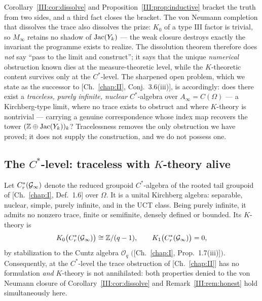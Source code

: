 \begin{remark}\label{III:rem:honest}
Corollary~\ref{III:cor:dissolve} and Proposition~\ref{III:prop:inductive} bracket the truth
from two sides, and a third fact closes the bracket. The von Neumann completion that
dissolves the trace also dissolves the prize: $K_0$ of a type III factor is trivial,
so $M_\infty$ retains no shadow of $\operatorname{Jac}(Y_k)$ --- the weak closure destroys exactly
the invariant the programme exists to realize. The dissolution theorem therefore does
\emph{not} say ``pass to the limit and construct''; it says that the unique
\emph{numerical} obstruction known dies at the measure-theoretic level, while the
$K$-theoretic content survives only at the $C^*$-level. The sharpened open problem,
which we state as the successor to [Ch.~\ref{chap:II}, Conj.~3.6(iii)], is accordingly: does there
exist a \emph{traceless, purely infinite, nuclear} $C^*$-algebra over
$A_\infty=C(\Omega)$ --- a Kirchberg-type limit, where no trace exists to obstruct and
where $K$-theory is nontrivial --- carrying a genuine correspondence whose index map
recovers the tower $(\mathbb{Z}\oplus\operatorname{Jac}(Y_k))_k$? Tracelessness removes the only obstruction
we have proved; it does not supply the construction, and we do not possess one.
\end{remark}

\subsection{The \texorpdfstring{$C^*$}{C*}-level: traceless with
\texorpdfstring{$K$}{K}-theory alive}\label{III:subsec:kirchberg}

\begin{proposition}\label{III:prop:kirchberg}
Let $C^*_r(\mathcal{G}_\infty)$ denote the reduced groupoid $C^*$-algebra of the rooted tail
groupoid of [Ch.~\ref{chap:I}, Def.~1.6] over $\Omega$. It is a unital Kirchberg algebra: separable,
nuclear, simple, purely infinite, and in the UCT class. Being purely infinite, it
admits no nonzero trace, finite or semifinite, densely defined or bounded. Its $K$-theory is
\[
K_0\bigl(C^*_r(\mathcal{G}_\infty)\bigr)\cong\mathbb{Z}/(q-1),\qquad
K_1\bigl(C^*_r(\mathcal{G}_\infty)\bigr)=0,
\]
by stabilization to the Cuntz algebra $\mathcal O_q$ $($[Ch.~\ref{chap:I}, Prop.~1.7(iii)]$)$.
Consequently, at the $C^*$-level the trace obstruction of [Ch.~\ref{chap:II}] has no formulation
\emph{and} $K$-theory is not annihilated: both properties denied to the von Neumann
closure of Corollary~\ref{III:cor:dissolve} and Remark~\ref{III:rem:honest} hold
simultaneously here.
\end{proposition}

